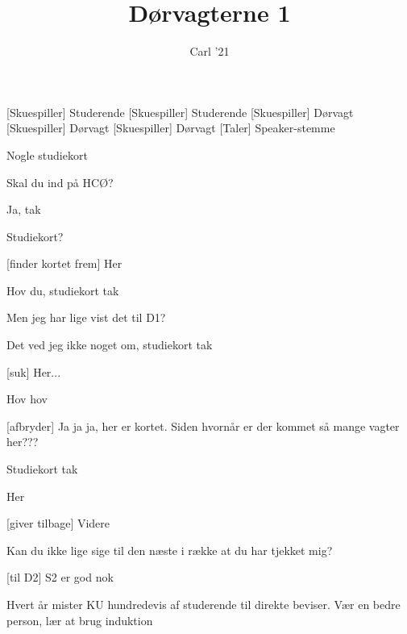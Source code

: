 \documentclass[a4paper,11pt]{article}
\title{Dørvagterne 1}
\author{Carl '21}
\begin{document}
\maketitle

\begin{roles}
[Skuespiller] Studerende
[Skuespiller] Studerende
[Skuespiller] Dørvagt
[Skuespiller] Dørvagt
[Skuespiller] Dørvagt
[Taler] Speaker-stemme
\end{roles}

\begin{props}
\item Nogle studiekort
\end{props}


\begin{sketch}

 Skal du ind på HCØ?

 Ja, tak

 Studiekort?

[finder kortet frem] Her


 Hov du, studiekort tak

 Men jeg har lige vist det til D1?

 Det ved jeg ikke noget om, studiekort tak

[suk] Her...


 Hov hov

[afbryder] Ja ja ja, her er kortet. Siden hvornår er der kommet så mange vagter her???


 Studiekort tak

 Her

[giver tilbage] Videre

 Kan du ikke lige sige til den næste i række at du har tjekket mig?

[til D2] S2 er god nok



 Hvert år mister KU hundredevis af studerende til direkte beviser. Vær en bedre person, lær at brug induktion


\end{sketch}
\end{document}
